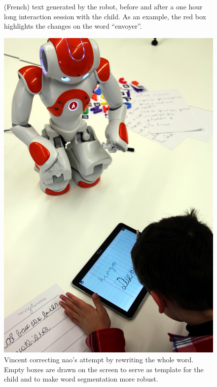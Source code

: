 \documentclass{sig-alternate}
\begin{document}
\begin{figure}
    \centering

    \caption{\small (French) text generated by the robot, before and after a one
        hour long interaction session with the child. As an example, the red box
        highlights the changes on the word ``envoyer''.}

    \label{fig:stimuli}
\end{figure}

\begin{figure}
    \centering
    \includegraphics[width=0.5\linewidth]{diego}
    \caption{\small Vincent correcting {\sc nao}'s attempt by rewriting the
        whole word. Empty boxes are drawn on the screen to serve as template for the child
        and to make word segmentation more robust.}
    \label{fig:diego}
\end{figure}
\end{document}
